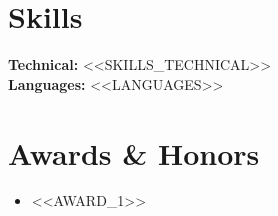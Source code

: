 \documentclass[10pt,a4paper]{article}
\begin{document}
\section{Skills}
\textbf{Technical:} <<SKILLS_TECHNICAL>>\\[2pt]
\textbf{Languages:} <<LANGUAGES>>

\section{Awards \& Honors}
\begin{itemize}
  \item <<AWARD_1>>
\end{itemize}
\end{document}
